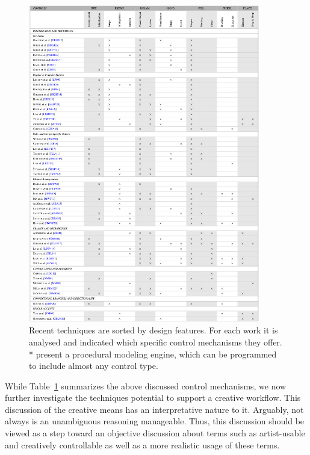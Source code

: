 \begin{figure}
    \centering
    \includegraphics[width=0.9\textwidth]{tables/table_all.png}
    \caption[Control mechanisms in the state of the art]{Recent techniques are sorted by design features. For each work it is analysed and indicated which specific control mechanisms they offer. *\cite{mech_2012_tdf} present a procedural modeling engine, which can be programmed to include almost any control type.\label{table:analysis}}
\end{figure}


While Table~\ref{table:analysis} summarizes the above discussed control mechanisms, we now further investigate the techniques potential to support a creative workflow. This discussion of the creative means has an interpretative nature to it. Arguably, not always is an unambiguous reasoning manageable. Thus, this discussion should be viewed as a step toward an objective discussion about terms such as artist-usable and creatively controllable as well as a more realistic usage of these terms.

